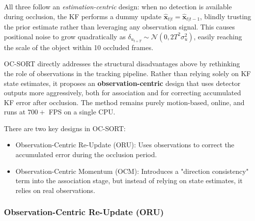 \documentclass[10pt,twocolumn,letterpaper]{article}
\begin{document}
All three follow an \textit{estimation-centric} design: when no detection is available during occlusion, the KF performs a dummy update $\hat{\mathbf{x}}_{t|t} = \hat{\mathbf{x}}_{t|t-1}$, blindly trusting the prior estimate rather than leveraging any observation signal. This causes positional noise to grow quadratically as $\delta_{u_{t+T}} \sim \mathcal{N}(0, 2T^2\sigma_u^2)$, easily reaching the scale of the object within 10 occluded frames. 

OC-SORT\cite{ocsort} directly addresses the structural disadvantages above by rethinking the role of observations in the tracking pipeline. Rather than relying solely on KF state estimates, it proposes an \textbf{observation-centric} design that uses detector outputs more aggressively, both for association and for correcting accumulated KF error after occlusion. The method remains purely motion-based, online, and runs at $700+$ FPS on a single CPU.

There are two key designs in OC-SORT:
\begin{itemize}
    \item Observation-Centric Re-Update (ORU): Uses observations to correct the accumulated error during the occlusion period.
    \item Observation-Centric Momentum (OCM): Introduces a "direction consistency" term into the association stage, but instead of relying on state estimates, it relies on real observations.
\end{itemize}


\subsubsection{Observation-Centric Re-Update (ORU)}
\end{document}
